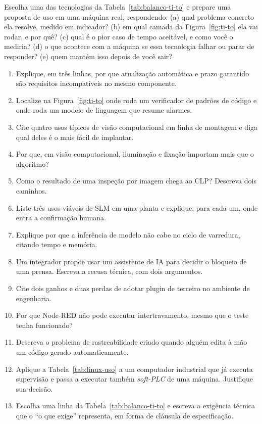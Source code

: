 \begin{pratica}
Escolha uma das tecnologias da Tabela~\ref{tab:balanco-ti-to} e prepare uma proposta de uso em uma
máquina real, respondendo:
(a) qual problema concreto ela resolve, medido em indicador?
(b) em qual camada da Figura~\ref{fig:ti-to} ela vai rodar, e por quê?
(c) qual é o pior caso de tempo aceitável, e como você o mediria?
(d) o que acontece com a máquina se essa tecnologia falhar ou parar de responder?
(e) quem mantém isso depois de você sair?
\end{pratica}

\begin{exercicios}
\begin{enumerate}[label=\alph*)]
  \item Explique, em três linhas, por que atualização automática e prazo garantido são requisitos
        incompatíveis no mesmo componente.
  \item Localize na Figura~\ref{fig:ti-to} onde roda um verificador de padrões de código e onde roda
        um modelo de linguagem que resume alarmes.
  \item Cite quatro usos típicos de visão computacional em linha de montagem e diga qual deles é o
        mais fácil de implantar.
  \item Por que, em visão computacional, iluminação e fixação importam mais que o algoritmo?
  \item Como o resultado de uma inspeção por imagem chega ao CLP? Descreva dois caminhos.
  \item Liste três usos viáveis de SLM em uma planta e explique, para cada um, onde entra a
        confirmação humana.
  \item Explique por que a inferência de modelo não cabe no ciclo de varredura, citando tempo e
        memória.
  \item Um integrador propõe usar um assistente de IA para decidir o bloqueio de uma prensa.
        Escreva a recusa técnica, com dois argumentos.
  \item Cite dois ganhos e duas perdas de adotar plugin de terceiro no ambiente de engenharia.
  \item Por que Node-RED não pode executar intertravamento, mesmo que o teste tenha funcionado?
  \item Descreva o problema de rastreabilidade criado quando alguém edita à mão um código gerado
        automaticamente.
  \item Aplique a Tabela~\ref{tab:linux-uso} a um computador industrial que já executa supervisão e
        passa a executar também \emph{soft-PLC} de uma máquina. Justifique sua decisão.
  \item Escolha uma linha da Tabela~\ref{tab:balanco-ti-to} e escreva a exigência técnica que o
        ``o que exige'' representa, em forma de cláusula de especificação.
\end{enumerate}
\end{exercicios}
